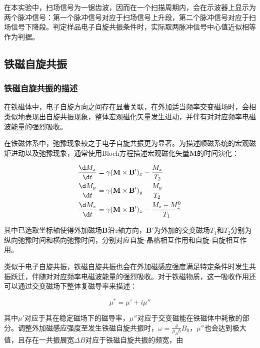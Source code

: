 \documentclass{thuemp}
\begin{document}
在本实验中，扫场信号为一锯齿波，因而在一个扫描周期内，会在示波器上显示为两个脉冲信号：第一个脉冲信号对应于扫场信号上升段，第二个脉冲信号对应于扫场信号下降段。判定样品电子自旋共振条件时，实际取两脉冲信号中心值近似相等作为判据。

\subsection{铁磁自旋共振}

\subsubsection{铁磁自旋共振的描述}

在铁磁体中，电子自旋方向之间存在显著关联，在外加适当频率交变磁场时，会相类似地表现出自旋共振现象，整体宏观磁化矢量发生进动，并伴有对对应频率电磁波能量的强烈吸收。

在铁磁体系中，弛豫现象较之于电子自旋共振更为显著。为描述顺磁系统的宏观磁矩进动以及弛豫现象，通常使用Bloch方程描述宏观磁化矢量$\mathbf{M}$的时间演化：

\begin{equation}
\begin{aligned}
    \frac{\d M_x}{\d t} &= \gamma (\mathbf{M} \times \mathbf{B'})_x - \frac{M_x}{T_2} \\
    \frac{\d M_y}{\d t} &= \gamma (\mathbf{M} \times \mathbf{B'})_y - \frac{M_y}{T_2} \\
    \frac{\d M_z}{\d t} &= \gamma (\mathbf{M} \times \mathbf{B'})_z - \frac{M_z - M_z^0}{T_1}
\end{aligned}
\end{equation}

其中已选取坐标轴使得外加磁场$\mathbf{B}$沿$z$轴方向，$\mathbf{B'}$为外加的交变磁场$T_1$和$T_2$分别为纵向弛豫时间和横向弛豫时间，分别对应自旋-晶格相互作用和自旋-自旋相互作用。

类似于电子自旋共振，铁磁自旋共振也会在外加磁感应强度满足特定条件时发生共振跃迁，伴随对对应频率电磁波能量的强烈吸收。对于铁磁物质，这一吸收作用还可以通过交变磁场下整体复磁导率来描述：

\begin{equation}
    \mu^* = \mu' + i\mu''
\end{equation}

其中$\mu'$对应于其在稳定磁场下的磁导率，$\mu''$对应于交变磁能在铁磁体中耗散的部分。调整外加磁感应强度至发生铁磁自旋共振时，$\omega = \frac{g}{\mu_B\hbar} B_0$，$\mu''$也会达到极大值，且存在一共振展宽$\Delta B$对应于铁磁自旋共振的频宽，由
\end{document}

